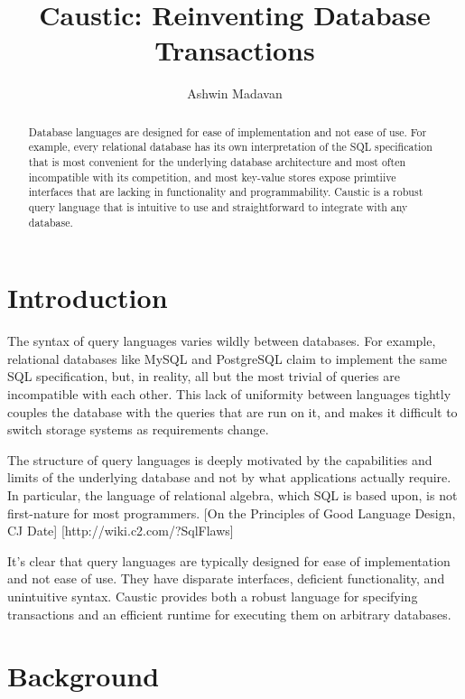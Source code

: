 \documentclass[journal]{../styles/IEEEtran}
\begin{document}
\title{Caustic: Reinventing Database Transactions}
\author{Ashwin Madavan}
\maketitle

\begin{abstract}
Database languages are designed for ease of implementation and not ease of use. For example, every relational database has its own interpretation of the SQL specification that is most convenient for the underlying database architecture and most often incompatible with its competition, and most key-value stores expose primtiive interfaces that are lacking in functionality and programmability. Caustic is a robust query language that is intuitive to use and straightforward to integrate with any database.
\end{abstract}

\section{Introduction}
The syntax of query languages varies wildly between databases. For example, relational databases like MySQL and PostgreSQL claim to implement the same SQL specification, but, in reality, all but the most trivial of queries are incompatible with each other. This lack of uniformity between languages tightly couples the database with the queries that are run on it, and makes it difficult to switch storage systems as requirements change.

The structure of query languages is deeply motivated by the capabilities and limits of the underlying database and not by what applications actually require. In particular, the language of relational algebra, which SQL is based upon, is not first-nature for most programmers. [On the Principles of Good Language Design, CJ Date] [http://wiki.c2.com/?SqlFlaws]

It's clear that query languages are typically designed for ease of implementation and not ease of use. They have disparate interfaces, deficient functionality, and unintuitive syntax. Caustic provides both a robust language for specifying transactions and an efficient runtime for executing them on arbitrary databases.

\section{Background}
\end{document}
